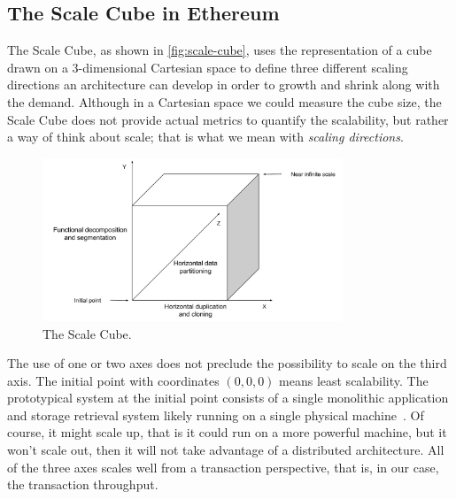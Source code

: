 \subsection{The Scale Cube in Ethereum}

The Scale Cube, as shown in \autoref{fig:scale-cube}, uses the representation of
a cube drawn on a 3-dimensional Cartesian space to define three different
scaling directions an architecture can develop in order to growth and shrink
along with the demand. Although in a Cartesian space we could measure the cube
size, the Scale Cube does not provide actual metrics to quantify the
scalability, but rather a way of think about scale; that is what we mean with
\emph{scaling directions}.

\begin{figure}
	\begin{center}
		\includegraphics[width=0.8\textwidth]{./res/img/scale-cube.pdf}
	\end{center}
	\caption{The Scale Cube.}
	\label{fig:scale-cube}
\end{figure}

The use of one or two axes does not preclude the possibility to scale on the
third axis. The initial point with coordinates $(0,0,0)$ means least
scalability. The prototypical system at the initial point consists of a single
monolithic application and storage retrieval system likely running on a single
physical machine~\cite{bib:art-of-scalability}. Of course, it might scale up,
that is it could run on a more powerful machine, but it won't scale out, then it
will not take advantage of a distributed architecture. All of the three axes
scales well from a transaction perspective, that is, in our case, the
transaction throughput. %
